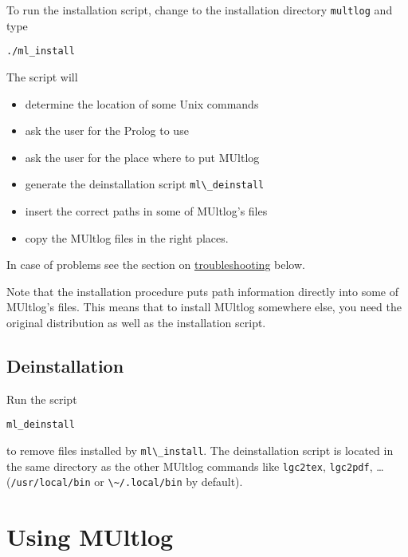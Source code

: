 \documentclass[
]{article}
\newcommand{\passthrough}[1]{#1}
\begin{document}
To run the installation script, change to the installation directory
\passthrough{\lstinline!multlog!} and type

\begin{lstlisting}
./ml_install
\end{lstlisting}

The script will
\begin{itemize}
\item determine the location of some Unix commands
\item ask the user for the Prolog to use
\item ask the user for the place where to put MUltlog
\item generate the deinstallation script \passthrough{\lstinline!ml\_deinstall!}
\item insert the correct paths in some of MUltlog's files
\item copy the MUltlog files in the right places.
\end{itemize}

In case of problems see the section on
\protect\hyperlink{troubleshooting}{troubleshooting} below.

Note that the installation procedure puts path information directly into
some of MUltlog's files. This means that to install MUltlog somewhere
else, you need the original distribution as well as the installation
script.

\hypertarget{deinstallation}{%
\subsection{Deinstallation}\label{deinstallation}}

Run the script

\begin{lstlisting}
ml_deinstall
\end{lstlisting}

to remove files installed by \passthrough{\lstinline!ml\_install!}. The
deinstallation script is located in the same directory as the other
MUltlog commands like \passthrough{\lstinline!lgc2tex!},
\passthrough{\lstinline!lgc2pdf!}, \ldots{}
(\passthrough{\lstinline!/usr/local/bin!} or
\passthrough{\lstinline!\~/.local/bin!} by default).

\hypertarget{using-multlog}{%
\section{Using MUltlog}\label{using-multlog}}
\end{document}
